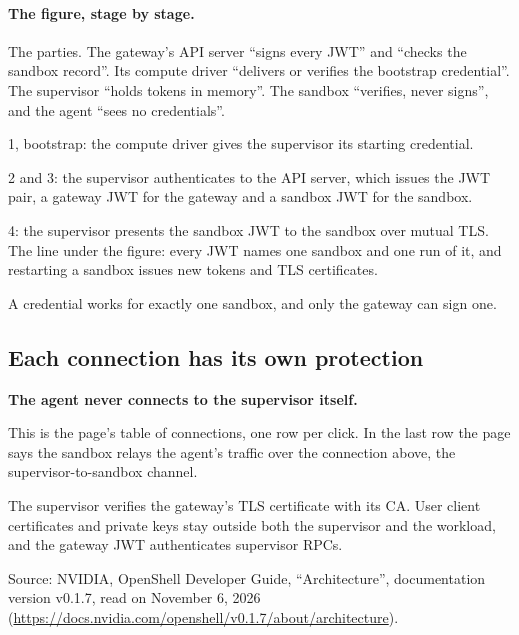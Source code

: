 \paragraph{The figure, stage by stage.}
\be
\item The parties. The gateway's API server ``signs every JWT'' and ``checks the sandbox record''. Its compute driver ``delivers or verifies the bootstrap credential''. The supervisor ``holds tokens in memory''. The sandbox ``verifies, never signs'', and the agent ``sees no credentials''.
\item 1, bootstrap: the compute driver gives the supervisor its starting credential.
\item 2 and 3: the supervisor authenticates to the API server, which issues the JWT pair, a gateway JWT for the gateway and a sandbox JWT for the sandbox.
\item 4: the supervisor presents the sandbox JWT to the sandbox over mutual TLS. The line under the figure: every JWT names one sandbox and one run of it, and restarting a sandbox issues new tokens and TLS certificates.
\ee

\begin{takeaway}A credential works for exactly one sandbox, and only the gateway can sign one.\end{takeaway}

\subsection{Each connection has its own protection}
\label{sec:it-os-5-2}

\textbf{The agent never connects to the supervisor itself.}

This is the page's table of connections, one row per click. In the last row the page says the sandbox relays the agent's traffic over the connection above, the supervisor-to-sandbox channel.

The supervisor verifies the gateway's TLS certificate with its CA. User client certificates and private keys stay outside both the supervisor and the workload, and the gateway JWT authenticates supervisor RPCs.

Source: NVIDIA, OpenShell Developer Guide, ``Architecture'', documentation version v0.1.7, read on November 6, 2026 (\url{https://docs.nvidia.com/openshell/v0.1.7/about/architecture}).

